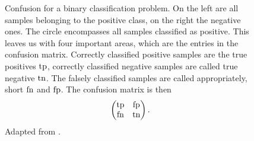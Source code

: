 \begin{figure}[tbp]
  \begin{captionbeside}{\label{fig:confusion}%
    Confusion for a binary classification problem.
    On the left are all samples belonging to the positive class, on
    the right the negative ones.
    The circle encompasses all samples classified as positive.
    This leaves us with four important areas, which are the entries in the
    confusion matrix. 
    Correctly classified positive samples are the true positives $\operatorname{tp}$,
    correctly classified negative samples are called true negative $\operatorname{tn}$.
    The falsely classified samples are called appropriately, short $\operatorname{fn}$ and $\operatorname{fp}$.
    The confusion matrix is then
    \begin{equation}
      \begin{pmatrix}\operatorname{tp} & \operatorname{fp} \\ \operatorname{fn} & \operatorname{tn} \end{pmatrix}.
    \end{equation}
    Adapted from \cite{confusion-matrix}.
  }%
    \raisebox{\dimexpr\baselineskip-\totalheight\relax}{%
    }%
  \end{captionbeside}
\end{figure}

